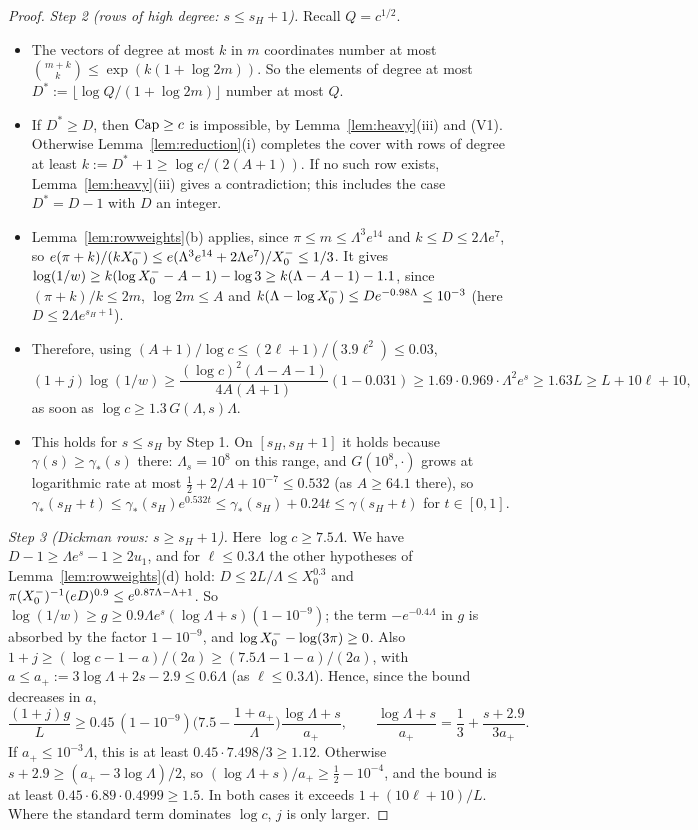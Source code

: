 \begin{proof}
\emph{Step 2 (rows of high degree: $s\le s_H+1$).} Recall $Q=c^{1/2}$.
\begin{itemize}
\item The vectors of degree at most $k$ in $m$ coordinates number at most $\binom{m+k}k\le\exp(k(1+\log2m))$. So the elements
  of degree at most $D^*:=\lfloor\log Q/(1+\log2m)\rfloor$ number at most $Q$.
\item If $D^*\ge D$, then $\operatorname{Cap}\ge c$ is impossible, by Lemma~\ref{lem:heavy}(iii) and (V1). Otherwise Lemma~\ref{lem:reduction}(i)
  completes the cover with rows of degree at least $k:=D^*+1\ge\log c/(2(A+1))$. If no such row exists,
  Lemma~\ref{lem:heavy}(iii) gives a contradiction; this includes the case $D^*=D-1$ with $D$ an integer.
\item Lemma~\ref{lem:rowweights}(b) applies, since $\pi\le m\le\Lambda^3e^{14}$ and $k\le D\le2\Lambda e^{7}$, so
  $e(\pi+k)/(kX_0^{-})\le e(\Lambda^3e^{14}+2\Lambda e^7)/X_0^{-}\le1/3$. It gives
  $\log(1/w)\ge k(\log X_0^{-}-A-1)-\log3\ge k(\Lambda-A-1)-1.1$, since $(\pi+k)/k\le2m$, $\log2m\le A$ and
  $k(\Lambda-\log X_0^{-})\le De^{-0.98\Lambda}\le10^{-3}$ (here $D\le2\Lambda e^{s_H+1}$).
\item Therefore, using $(A+1)/\log c\le(2\ell+1)/(3.9\ell^2)\le0.03$,
  \[
  (1+j)\log(1/w)\ge\frac{(\log c)^2(\Lambda-A-1)}{4A(A+1)}(1-0.031)\ge1.69\cdot0.969\cdot\Lambda^2e^s\ge1.63L\ge L+10\ell+10,
  \]
  as soon as $\log c\ge1.3\,G(\Lambda,s)\Lambda$.
\item This holds for $s\le s_H$ by Step 1. On $[s_H,s_H+1]$ it holds because $\gamma(s)\ge\gamma_*(s)$ there: $\Lambda_s=10^8$ on this range, and $G(10^8,\cdot)$
  grows at logarithmic rate at most $\tfrac12+2/A+10^{-7}\le0.532$ (as $A\ge64.1$ there), so
  $\gamma_*(s_H+t)\le\gamma_*(s_H)e^{0.532t}\le\gamma_*(s_H)+0.24t\le\gamma(s_H+t)$ for $t\in[0,1]$.
\end{itemize}

\emph{Step 3 (Dickman rows: $s\ge s_H+1$).} Here $\log c\ge7.5\Lambda$. We have $D-1\ge\Lambda e^s-1\ge2u_1$, and for
$\ell\le0.3\Lambda$ the other hypotheses of Lemma~\ref{lem:rowweights}(d) hold: $D\le2L/\Lambda\le X_0^{0.3}$ and
$\pi(X_0^{-})^{-1}(eD)^{0.9}\le e^{0.87\Lambda-\Lambda+1}$. So $\log(1/w)\ge g\ge0.9\Lambda e^s(\log\Lambda+s)(1-10^{-9})$; the
term $-e^{-0.4\Lambda}$ in $g$ is absorbed by the factor $1-10^{-9}$, and $\log X_0^{-}-\log(3\pi)\ge0$. Also $1+j\ge(\log c-1-a)/(2a)\ge(7.5\Lambda-1-a)/(2a)$, with
$a\le a_+:=3\log\Lambda+2s-2.9\le0.6\Lambda$ (as $\ell\le0.3\Lambda$). Hence, since the bound decreases in $a$,
\[
\frac{(1+j)g}{L}\ge0.45\,(1-10^{-9})\Big(7.5-\frac{1+a_+}{\Lambda}\Big)\frac{\log\Lambda+s}{a_+},\qquad
\frac{\log\Lambda+s}{a_+}=\frac13+\frac{s+2.9}{3a_+}.
\]
If $a_+\le10^{-3}\Lambda$, this is at least $0.45\cdot7.498/3\ge1.12$. Otherwise $s+2.9\ge(a_+-3\log\Lambda)/2$, so
$(\log\Lambda+s)/a_+\ge\tfrac12-10^{-4}$, and the bound is at least $0.45\cdot6.89\cdot0.4999\ge1.5$. In both cases it
exceeds $1+(10\ell+10)/L$.
Where the standard term dominates $\log c$, $j$ is only larger.


\end{proof}
